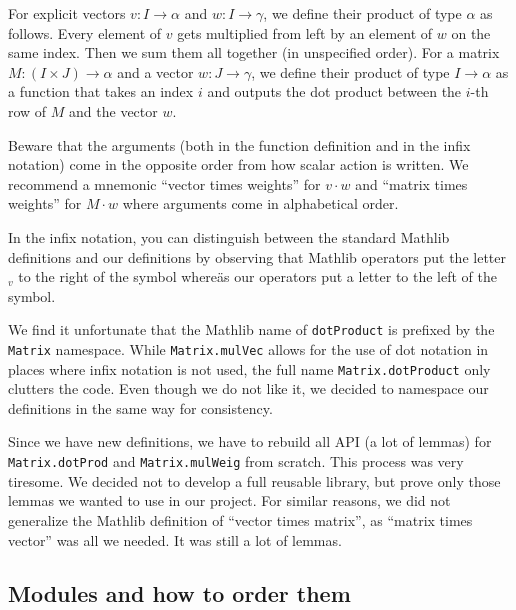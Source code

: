\documentclass[]{article}
\renewcommand{\.}{\hskip .75pt}
\let\r=\rightarrow
\let\*=\cdot
\begin{document}
For explicit vectors
$v : I \r \alpha$ and $w : I \r \gamma$, we define
their product of type $\alpha$ as follows.
Every element of $v$ gets multiplied from left by
an element of $w$ on the same index.
Then we sum them all together (in unspecified order).
For a matrix $M : (I \times J) \r \alpha$ and
a vector $w : J \r \gamma$, we define
their product of type $I \r \alpha$ as a function
that takes an index $i$ and outputs the dot product
between the $i$-th row of $M$ and the vector $w$.

Beware that the arguments (both in the function definition and
in the infix notation) come in the opposite order from how
scalar action is written. We recommend a mnemonic 
``vector times weights'' for $v \* w$ and
``matrix times weights'' for $M \* w$ where
arguments come in alphabetical order.

In the infix notation, you can distinguish between the standard
Mathlib definitions and our definitions by observing that Mathlib
operators put the letter $_v$ to the right of the symbol whereäs
our operators put a letter to the left of the symbol.

We find it unfortunate that the Mathlib name of \texttt{dotProduct}
is prefixed by the \texttt{Matrix} namespace.
While \texttt{Matrix.mulVec} allows for the use of dot notation
in places where infix notation is not used, the full name
\texttt{Matrix.dotProduct} only clutters the code.
Even though we do not like it, we decided to namespace our definitions
in the same way for consistency.

Since we have new definitions, we have to rebuild all API (a lot of lemmas)
for \texttt{Matrix.dotProd} and \texttt{Matrix.mulWeig} from scratch.
This process was very tiresome. We decided not to develop a full reusable
library, but prove only those lemmas we wanted to use in our project.
For similar reasons, we did not generalize the Mathlib definition of
``vector times matrix'', as ``matrix times vector'' was all we needed.
It was still a lot of lemmas.

\subsection{Modules and how to order them}
\label{modules}
\end{document}
